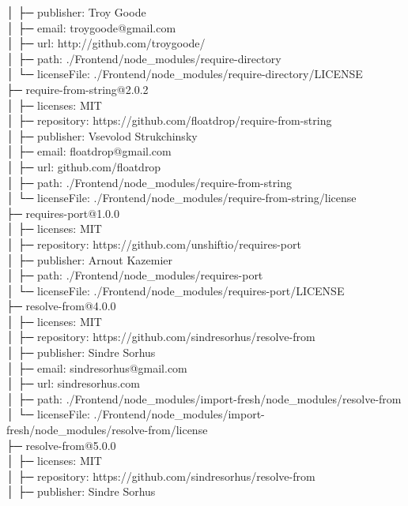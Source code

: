 │  ├─ publisher: Troy Goode\\
│  ├─ email: troygoode@gmail.com\\
│  ├─ url: http://github.com/troygoode/\\
│  ├─ path: ./Frontend/node\_modules/require-directory\\
│  └─ licenseFile: ./Frontend/node\_modules/require-directory/LICENSE\\
├─ require-from-string@2.0.2\\
│  ├─ licenses: MIT\\
│  ├─ repository: https://github.com/floatdrop/require-from-string\\
│  ├─ publisher: Vsevolod Strukchinsky\\
│  ├─ email: floatdrop@gmail.com\\
│  ├─ url: github.com/floatdrop\\
│  ├─ path: ./Frontend/node\_modules/require-from-string\\
│  └─ licenseFile: ./Frontend/node\_modules/require-from-string/license\\
├─ requires-port@1.0.0\\
│  ├─ licenses: MIT\\
│  ├─ repository: https://github.com/unshiftio/requires-port\\
│  ├─ publisher: Arnout Kazemier\\
│  ├─ path: ./Frontend/node\_modules/requires-port\\
│  └─ licenseFile: ./Frontend/node\_modules/requires-port/LICENSE\\
├─ resolve-from@4.0.0\\
│  ├─ licenses: MIT\\
│  ├─ repository: https://github.com/sindresorhus/resolve-from\\
│  ├─ publisher: Sindre Sorhus\\
│  ├─ email: sindresorhus@gmail.com\\
│  ├─ url: sindresorhus.com\\
│  ├─ path: ./Frontend/node\_modules/import-fresh/node\_modules/resolve-from\\
│  └─ licenseFile: ./Frontend/node\_modules/import-fresh/node\_modules/resolve-from/license\\
├─ resolve-from@5.0.0\\
│  ├─ licenses: MIT\\
│  ├─ repository: https://github.com/sindresorhus/resolve-from\\
│  ├─ publisher: Sindre Sorhus\\
